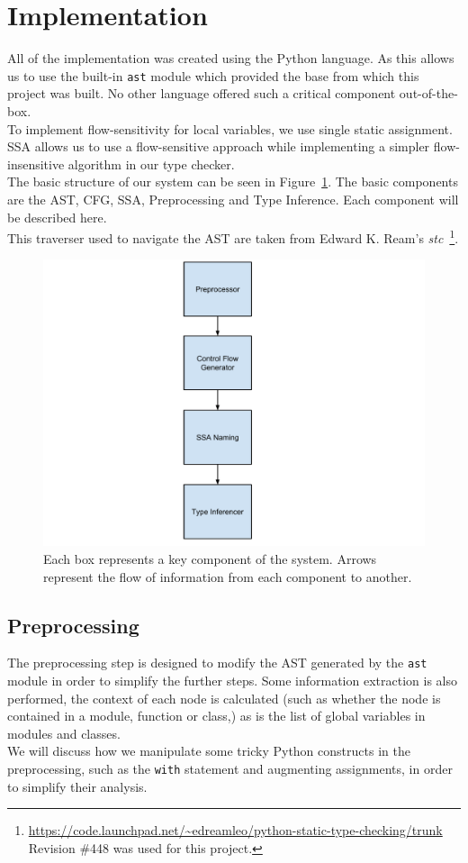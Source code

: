 \documentclass[12pt, titlepage]{article}
\begin{document}
\newpage
\section{Implementation}
All of the implementation was created using the Python language. As this allows us to use the built-in \texttt{ast} module which provided the base from which this project was built. No other language offered such a critical component out-of-the-box. \\
\indent To implement flow-sensitivity for local variables, we use single static assignment. SSA allows us to use a flow-sensitive approach while implementing a simpler flow-insensitive algorithm in our type checker. \\
\indent The basic structure of our system can be seen in Figure~\ref{fig:systemStructure}. The basic components are the AST, CFG, SSA, Preprocessing and Type Inference. Each component will be described here. \\
\indent This traverser used to navigate the AST are taken from Edward K. Ream's \textit{stc}~\footnote{\url{https://code.launchpad.net/~edreamleo/python-static-type-checking/trunk} Revision \#448 was used for this project.}.


\begin{figure}
\centering
\includegraphics[scale=0.5]{images/systemStructure.pdf}
\caption{Each box represents a key component of the system. Arrows represent the flow of information from each component to another.}
\label{fig:systemStructure}
\end{figure}

\subsection{Preprocessing}
The preprocessing step is designed to modify the AST generated by the \texttt{ast} module in order to simplify the further steps. Some information extraction is also performed, the context of each node is calculated (such as whether the node is contained in a module, function or class,) as is the list of global variables in modules and classes. \\
\indent We will discuss how we manipulate some tricky Python constructs in the preprocessing, such as the \texttt{with} statement and augmenting assignments, in order to simplify their analysis.
\end{document}

